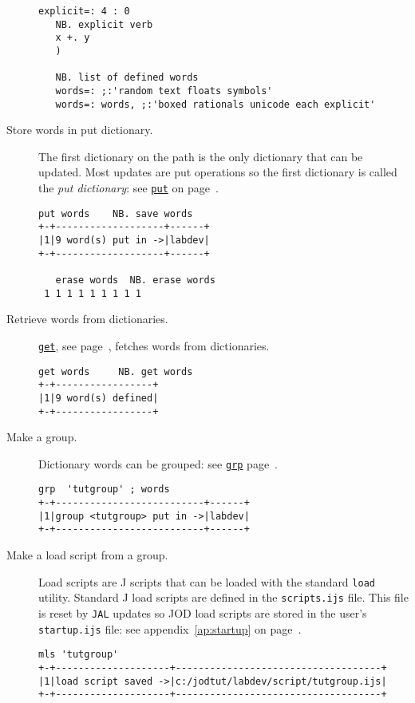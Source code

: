 \begin{description}
\begin{lstlisting}[frame=single,framerule=0pt]
   explicit=: 4 : 0
   NB. explicit verb
   x +. y
   )
   
   NB. list of defined words
   words=: ;:'random text floats symbols'
   words=: words, ;:'boxed rationals unicode each explicit'
\end{lstlisting}

\item[Store words in put dictionary.] The first dictionary on the path is the
only dictionary that can be updated.  Most updates are put
operations so the first dictionary is called the \emph{put dictionary}: see
\hyperlink{il:put}{\texttt{put}} on page~\pageref{ss:put}.
\begin{lstlisting}[frame=single,framerule=0pt]
   put words    NB. save words
+-+-------------------+------+
|1|9 word(s) put in ->|labdev|
+-+-------------------+------+

   erase words  NB. erase words
 1 1 1 1 1 1 1 1 1
\end{lstlisting}

\item[Retrieve words from dictionaries.] \hyperlink{il:get}{\texttt{get}}, see 
page~\pageref{ss:get}, fetches words from dictionaries.  
\begin{lstlisting}[frame=single,framerule=0pt]
   get words     NB. get words
+-+-----------------+
|1|9 word(s) defined|
+-+-----------------+
\end{lstlisting}

\item[Make a group.] Dictionary words can be grouped: see \hyperlink{il:grp}{\texttt{grp}} 
page~\pageref{ss:grp}.  
\begin{lstlisting}[frame=single,framerule=0pt]
   grp  'tutgroup' ; words
+-+--------------------------+------+
|1|group <tutgroup> put in ->|labdev|
+-+--------------------------+------+
\end{lstlisting}

\item[Make a load script from a group.] Load scripts are J scripts that can be loaded
with the standard \texttt{load} utility.  Standard J load scripts are defined in the \verb|scripts.ijs| file.  This file is reset by \texttt{JAL} updates
so JOD load scripts are stored in the user's \verb|startup.ijs| file: 
see appendix~\ref{ap:startup} on page~\pageref{ap:startup}.
\begin{lstlisting}[frame=single,framerule=0pt]
   mls 'tutgroup'
+-+--------------------+------------------------------------+
|1|load script saved ->|c:/jodtut/labdev/script/tutgroup.ijs|
+-+--------------------+------------------------------------+


\end{lstlisting}
\end{description}
